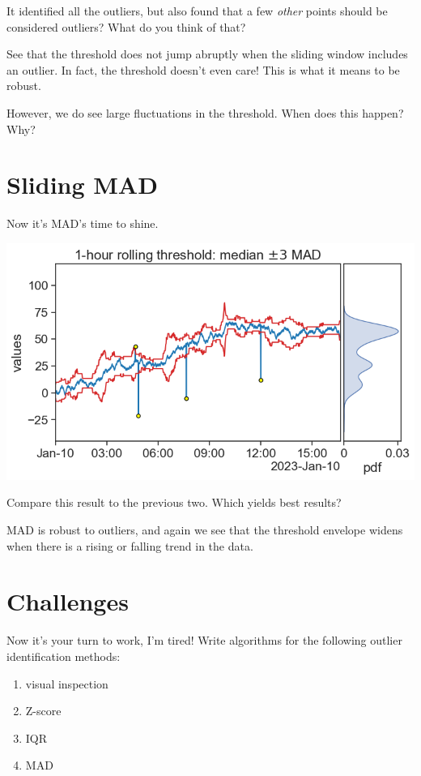 \documentclass[
  letterpaper,
  DIV=11,
  numbers=noendperiod,
  oneside]{scrreprt}
\providecommand{\tightlist}{%
  \setlength{\itemsep}{0pt}\setlength{\parskip}{0pt}}\usepackage{longtable,booktabs,array}
\begin{document}
It identified all the outliers, but also found that a few \emph{other}
points should be considered outliers? What do you think of that?

See that the threshold does not jump abruptly when the sliding window
includes an outlier. In fact, the threshold doesn't even care! This is
what it means to be robust.

However, we do see large fluctuations in the threshold. When does this
happen? Why?

\hypertarget{sliding-mad}{%
\section{Sliding MAD}\label{sliding-mad}}

Now it's MAD's time to shine.

\includegraphics{outliers/outliers_rolling_MAD.png}

Compare this result to the previous two. Which yields best results?

MAD is robust to outliers, and again we see that the threshold envelope
widens when there is a rising or falling trend in the data.

\hypertarget{challenges-1}{%
\section{Challenges}\label{challenges-1}}

Now it's your turn to work, I'm tired! Write algorithms for the
following outlier identification methods:

\begin{enumerate}
\def\labelenumi{\arabic{enumi}.}
\tightlist
\item
  visual inspection
\item
  Z-score
\item
  IQR
\item
  MAD
\end{enumerate}
\end{document}
